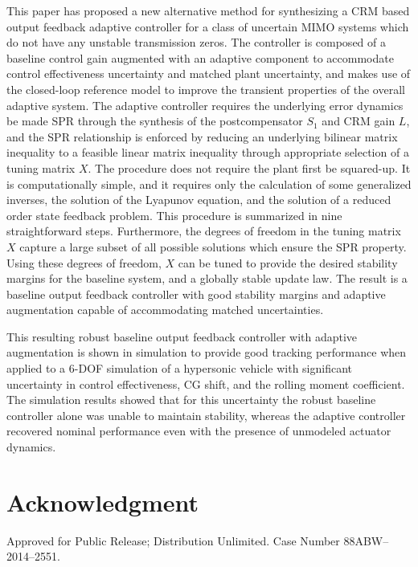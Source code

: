 \documentclass[]{../sty/aiaa-tc}
\newcommand{\bibsourcepath}{../bib/aiaa-gnc-2015}
\begin{document}
  This paper has proposed a new alternative method for synthesizing a CRM based output feedback adaptive controller for a class of uncertain MIMO systems which do not have any unstable transmission zeros.
  The controller is composed of a baseline control gain augmented with an adaptive component to accommodate control effectiveness uncertainty and matched plant uncertainty, and makes use of the closed-loop reference model to improve the transient properties of the overall adaptive system.
  The adaptive controller requires the underlying error dynamics be made SPR through the synthesis of the postcompensator $S_{1}$ and CRM gain $L$, and the SPR relationship is enforced by reducing an underlying bilinear matrix inequality to a feasible linear matrix inequality through appropriate selection of a tuning matrix $X$.
  The procedure does not require the plant first be squared-up.
  It is computationally simple, and it requires only the calculation of some generalized inverses, the solution of the Lyapunov equation, and the solution of a reduced order state feedback problem.
  This procedure is summarized in nine straightforward steps.
  Furthermore, the degrees of freedom in the tuning matrix $X$ capture a large subset of all possible solutions which ensure the SPR property.
  Using these degrees of freedom, $X$ can be tuned to provide the desired stability margins for the baseline system, and a globally stable update law.
  The result is a baseline output feedback controller with good stability margins and adaptive augmentation capable of accommodating matched uncertainties.

  This resulting robust baseline output feedback controller with adaptive augmentation is shown in simulation to provide good tracking performance when applied to a 6-DOF simulation of a hypersonic vehicle with significant uncertainty in control effectiveness, CG shift, and the rolling moment coefficient.
  The simulation results showed that for this uncertainty the robust baseline controller alone was unable to maintain stability, whereas the adaptive controller recovered nominal performance even with the presence of unmodeled actuator dynamics.

  \section{Acknowledgment}

  Approved for Public Release; Distribution Unlimited.
  Case Number 88ABW--2014--2551.

  
  
\end{document}
